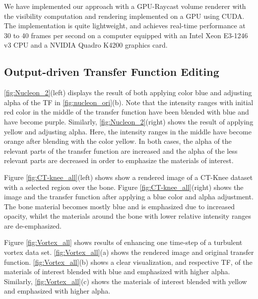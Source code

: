 \documentclass[twoside,twocolumn,10pt]{article}
\begin{document}
We have implemented our approach with a GPU-Raycast volume renderer with the visibility computation and rendering implemented on a GPU using CUDA. The implementation is quite lightweight, and achieves real-time performance at 30 to 40 frames per second on a computer equipped with an Intel Xeon E3-1246 v3 CPU and a NVIDIA Quadro K4200 graphics card.

\subsection{Output-driven Transfer Function Editing}

\autoref{fig:Nucleon_2}(left) displays the result of both applying color blue and adjusting alpha of the TF in \autoref{fig:nucleon_ori}(b). Note that the intensity ranges with initial red color in the middle of the transfer function have been blended with blue and have become purple.
Similarly, \autoref{fig:Nucleon_2}(right) shows the result of applying yellow and adjusting alpha. Here, the intensity ranges in the middle have become orange after blending with the color yellow. 
In both cases, the alpha of the relevant parts of the transfer function are increased and the alpha of the less relevant parts are decreased in order to emphasize the materials of interest.

Figure \ref{fig:CT-knee_all}(left) shows show a rendered image of a CT-Knee dataset with a selected region over the bone. Figure \ref{fig:CT-knee_all}(right) shows the image and the transfer function after applying a blue color and alpha adjustment. The bone material becomes mostly blue and is emphasized due to increased opacity, whilst the materials around the bone with lower relative intensity ranges are de-emphasized.

Figure \ref{fig:Vortex_all} shows results of enhancing one time-step of a turbulent vortex data set.
\autoref{fig:Vortex_all}(a) shows the rendered image and original transfer function.
\autoref{fig:Vortex_all}(b) shows a clear visualization, and respective TF, of the materials of interest blended with blue and emphasized with higher alpha.
Similarly, \autoref{fig:Vortex_all}(c) shows the materials of interest blended with yellow and emphasized with higher alpha.
\end{document}
